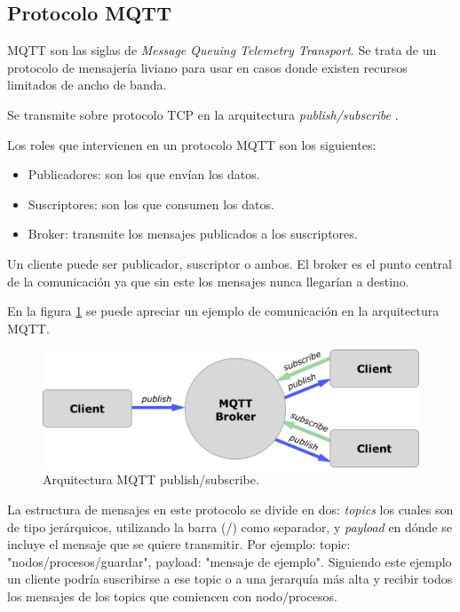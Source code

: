 \subsection{Protocolo MQTT}
\label{subsec:mqtt}

MQTT \citep{WEBSITE:MQTT} son las siglas de \textit{Message Queuing Telemetry Transport}. Se trata de un protocolo de mensajería liviano para usar en casos donde existen recursos limitados de ancho de banda. 

Se transmite sobre protocolo TCP en la arquitectura \textit{publish/subscribe} \citep{WEBSITE:PUBSUB}.

Los roles que intervienen en un protocolo MQTT son los siguientes:
\begin{itemize}
	\item Publicadores: son los que envían los datos.
	\item Suscriptores: son los que consumen los datos.
	\item Broker: transmite los mensajes publicados a los suscriptores.	
\end{itemize}

Un cliente puede ser publicador, suscriptor o ambos. El broker es el punto central de la comunicación ya que sin este los mensajes nunca llegarían a destino. 

En la figura \ref{fig:mqttArq} se puede apreciar un ejemplo de comunicación en la arquitectura MQTT.


\begin{figure}[ht]
	\centering
	\includegraphics[scale=.25]{./Figures/mqtt-diagram.png}
	\caption{Arquitectura MQTT publish/subscribe.}
	\label{fig:mqttArq}
\end{figure}

La estructura de mensajes en este protocolo se divide en dos: \textit{topics} los cuales son de tipo jerárquicos, utilizando la barra (/) como separador, y \textit{payload} en dónde se incluye el mensaje que se quiere transmitir. Por ejemplo: topic: "nodos/procesos/guardar", payload: "mensaje de ejemplo". Siguiendo este ejemplo un cliente podría suscribirse a ese topic o a una jerarquía más alta y recibir todos los mensajes de los topics que comiencen con nodo/procesos. 

